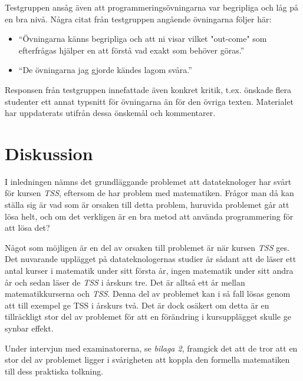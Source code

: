 \documentclass[]{article}
\begin{document}
Testgruppen ansåg även att programmeringsövningarna var begripliga och låg på en bra nivå. Några citat från testgruppen 
angående övningarna följer här:
\begin{itemize}
  \item “Övningarna känns begripliga och att ni visar vilket "out-come" som efterfrågas hjälper en att förstå vad 
  exakt som behöver göras.”
  \item “De övningarna jag gjorde kändes lagom svåra.”
  \end{itemize}

Responsen från testgruppen innefattade även konkret kritik, t.ex. önskade flera studenter ett annat typsnitt för
övningarna än för den övriga texten. Materialet har uppdaterats utifrån dessa önskemål och kommentarer.

\section{Diskussion}




I inledningen nämns det grundläggande problemet att datateknologer har svårt för kursen \textit{TSS}, eftersom de har problem 
med matematiken. Frågor man då kan ställa sig är vad som är orsaken till detta problem, huruvida problemet går att lösa 
helt, och om det verkligen är en bra metod att använda programmering för att lösa det?

Något som möjligen är en del av orsaken till problemet är när kursen \textit{TSS} ges. Det nuvarande upplägget på 
datateknologernas studier är sådant att de läser ett antal kurser i matematik under sitt första år, ingen matematik 
under sitt andra år och sedan läser de \textit{TSS} i årskurs tre. Det är alltså ett år mellan matematikkurserna och 
\textit{TSS}. Denna del av problemet kan i så fall lösas genom att till exempel ge TSS i årskurs två. Det är dock 
osäkert om detta är en tillräckligt stor del av problemet för att en förändring i kursupplägget skulle ge synbar effekt.

Under intervjun med examinatorerna, se \textit{bilaga 2}, framgick det att de tror att en stor del av problemet ligger i 
svårigheten att koppla den formella matematiken till dess praktiska tolkning.
\end{document}

